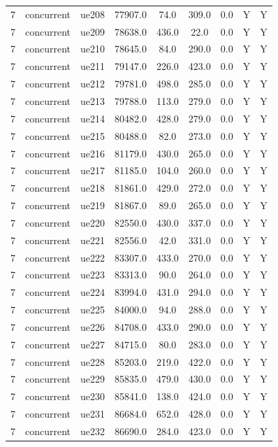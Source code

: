 \begin{table}[ht]
\begin{tabular}{|c|c|c|c|c|c|c|c|c|}
7 & concurrent & ue208 & 77907.0 & 74.0 & 309.0 & 0.0 & Y & Y \\
7 & concurrent & ue209 & 78638.0 & 436.0 & 22.0 & 0.0 & Y & Y \\
7 & concurrent & ue210 & 78645.0 & 84.0 & 290.0 & 0.0 & Y & Y \\
7 & concurrent & ue211 & 79147.0 & 226.0 & 423.0 & 0.0 & Y & Y \\
7 & concurrent & ue212 & 79781.0 & 498.0 & 285.0 & 0.0 & Y & Y \\
7 & concurrent & ue213 & 79788.0 & 113.0 & 279.0 & 0.0 & Y & Y \\
7 & concurrent & ue214 & 80482.0 & 428.0 & 279.0 & 0.0 & Y & Y \\
7 & concurrent & ue215 & 80488.0 & 82.0 & 273.0 & 0.0 & Y & Y \\
7 & concurrent & ue216 & 81179.0 & 430.0 & 265.0 & 0.0 & Y & Y \\
7 & concurrent & ue217 & 81185.0 & 104.0 & 260.0 & 0.0 & Y & Y \\
7 & concurrent & ue218 & 81861.0 & 429.0 & 272.0 & 0.0 & Y & Y \\
7 & concurrent & ue219 & 81867.0 & 89.0 & 265.0 & 0.0 & Y & Y \\
7 & concurrent & ue220 & 82550.0 & 430.0 & 337.0 & 0.0 & Y & Y \\
7 & concurrent & ue221 & 82556.0 & 42.0 & 331.0 & 0.0 & Y & Y \\
7 & concurrent & ue222 & 83307.0 & 433.0 & 270.0 & 0.0 & Y & Y \\
7 & concurrent & ue223 & 83313.0 & 90.0 & 264.0 & 0.0 & Y & Y \\
7 & concurrent & ue224 & 83994.0 & 431.0 & 294.0 & 0.0 & Y & Y \\
7 & concurrent & ue225 & 84000.0 & 94.0 & 288.0 & 0.0 & Y & Y \\
7 & concurrent & ue226 & 84708.0 & 433.0 & 290.0 & 0.0 & Y & Y \\
7 & concurrent & ue227 & 84715.0 & 80.0 & 283.0 & 0.0 & Y & Y \\
7 & concurrent & ue228 & 85203.0 & 219.0 & 422.0 & 0.0 & Y & Y \\
7 & concurrent & ue229 & 85835.0 & 479.0 & 430.0 & 0.0 & Y & Y \\
7 & concurrent & ue230 & 85841.0 & 138.0 & 424.0 & 0.0 & Y & Y \\
7 & concurrent & ue231 & 86684.0 & 652.0 & 428.0 & 0.0 & Y & Y \\
7 & concurrent & ue232 & 86690.0 & 284.0 & 423.0 & 0.0 & Y & Y \\

\end{tabular}
\end{table}
